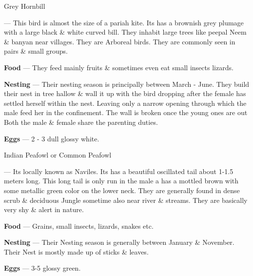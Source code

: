 \begin{bird}{Grey Hornbill}

 --- This bird is almost the size of a pariah kite. Its has a brownish grey plumage with a large black \& white curved bill. They inhabit large trees like peepal Neem \& banyan near villages. They are Arboreal birds. They are commonly seen in pairs \& small groups.

{\large\bf Food} --- They feed mainly fruits \& sometimes even eat small insects lizards.

{\large\bf Nesting} --- Their nesting season is principally between March - June. They build their nest in tree hallow \& wall it up with the bird dropping after the female has settled herself within the nest. Leaving only a narrow opening through which the male feed her in the confinement. The wall is broken once the young ones are out Both the male \& female share the parenting duties.

{\large\bf Eggs} --- 2 - 3 dull glossy white.
\end{bird}

\begin{bird}{Indian Peafowl or Common Peafowl}

 --- Its locally known as Naviles. Its has a beautiful oscillated tail about 1-1.5 meters long. This long tail is only run in the male a has a mottled brown with some metallic green color on the lower neck. They are generally found in dense scrub \& deciduous Jungle sometime also near river \& streams. They are basically very shy \& alert in nature.

{\large\bf Food} --- Grains, small insects, lizards, snakes etc.

{\large\bf Nesting} --- Their Nesting season is generally between January \& November. Their Nest is mostly made up of sticks \& leaves.

{\large\bf Eggs} --- 3-5 glossy green.
\end{bird}

